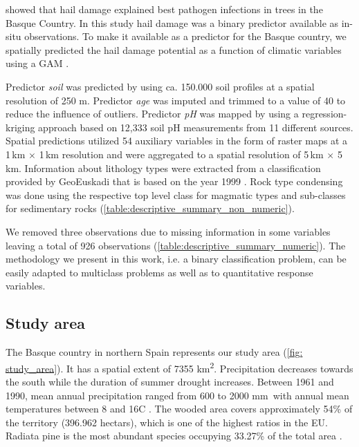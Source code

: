 \documentclass[review]{elsarticle}
\begin{document}
\cite{Iturritxa2014} showed that hail damage explained best pathogen infections in trees in the Basque Country. %
In this study hail damage was a binary predictor available as in-situ observations.
To make it available as a predictor for the Basque country, we spatially predicted the hail damage potential as a function of climatic variables using a \ac{GAM} \citep{Schratz2016}.

Predictor \textit{soil} was predicted by \cite{Hengl2017} using ca. 150.000 soil profiles at a spatial resolution of 250 m.
Predictor \textit{age} was imputed and trimmed to a value of 40 to reduce the influence of outliers.
Predictor \textit{pH} was mapped by \cite{ph} using a regression-kriging approach based on 12,333 soil pH measurements from 11 different sources.
Spatial predictions utilized 54 auxiliary variables in the form of raster maps at a 1\,km $\times$ 1\,km resolution and were aggregated to a spatial resolution of 5\,km $\times$ 5\,km.
Information about lithology types were extracted from a classification provided by GeoEuskadi that is based on the year 1999 \citep{lithology}.
Rock type condensing was done using the respective top level class for magmatic types and sub-classes for sedimentary rocks \citep{Grotzinger2016} (\autoref{table:descriptive_summary_non_numeric}).

We removed three observations due to missing information in some variables leaving a total of 926 observations (\autoref{table:descriptive_summary_numeric}).
The methodology we present in this work, i.e. a binary classification problem, can be easily adapted to multiclass problems as well as to quantitative response variables.

\subsection{Study area}

The Basque country in northern Spain represents our study area (\autoref{fig: study_area}).
It has a spatial extent of 7355 km\textsuperscript{2}.
Precipitation decreases towards the south while the duration of summer drought increases.
Between 1961 and 1990, mean annual precipitation ranged from 600 to 2000 mm\, with annual mean temperatures between 8 and 16\degree C \citep{Ganuza2003}.
The wooded area covers approximately 54\% of the territory (396.962 hectars), which is one of the highest ratios in the EU.
Radiata pine is the most abundant species occupying 33.27\% of the total area \citep{Mugica2016}.
\end{document}
